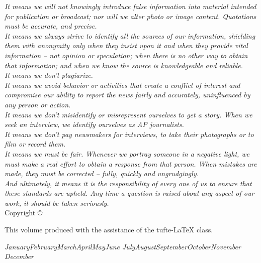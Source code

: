 \documentclass[symmetric, notoc]{tufte-book}
\newcommand{\monthyear}{%
  \ifcase\month\or January\or February\or March\or April\or May\or June\or
  July\or August\or September\or October\or November\or
  December\fi\space\number\year
}
\begin{document}
\noindent\textit{It means we will not knowingly introduce false information into material intended for publication or broadcast; nor will we alter photo or image content. Quotations must be accurate, and precise.}\\[0.5cm]

\noindent\textit{It means we always strive to identify all the sources of our information, shielding them with anonymity only when they insist upon it and when they provide vital information – not opinion or speculation; when there is no other way to obtain that information; and when we know the source is knowledgeable and reliable.}\\[0.5cm]

\noindent\textit{It means we don't plagiarize.}\\[0.5cm]

\noindent\textit{It means we avoid behavior or activities that create a conflict of interest and compromise our ability to report the news fairly and accurately, uninfluenced by any person or action.}\\[0.5cm]

\noindent\textit{It means we don't misidentify or misrepresent ourselves to get a story. When we seek an interview, we identify ourselves as AP journalists.}\\[0.5cm]

\noindent\textit{It means we don’t pay newsmakers for interviews, to take their photographs or to film or record them.}\\[0.5cm]

\noindent\textit{It means we must be fair. Whenever we portray someone in a negative light, we must make a real effort to obtain a response from that person. When mistakes are made, they must be corrected – fully, quickly and ungrudgingly.}\\[0.5cm]

\noindent\textit{And ultimately, it means it is the responsibility of every one of us to ensure that these standards are upheld. Any time a question is raised about any aspect of our work, it should be taken seriously.}\\[0.5cm]

\noindent \small{Copyright \copyright\ \the\year\ \thanklessauthor}

\noindent \small{This volume produced with the assistance of the \textsf{tufte-\LaTeX{}} class.}

\noindent\textit{\monthyear}

\tableofcontents
\end{document}
